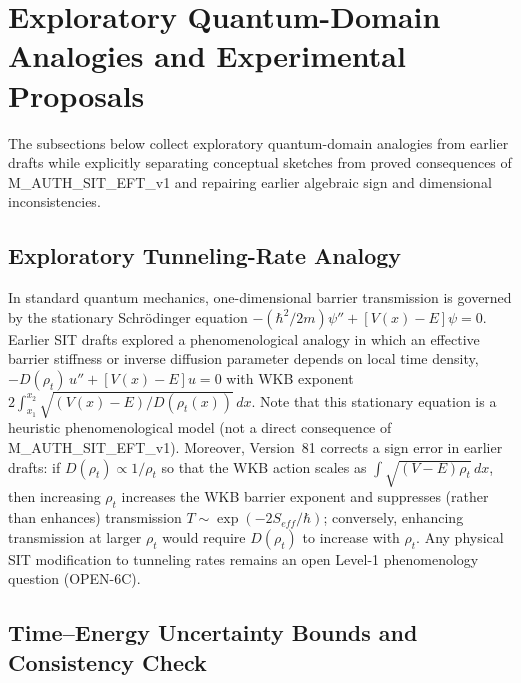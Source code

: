 \documentclass[american,11pt,letterpaper]{article}
\def\mathrm#1{#1}%
\def\texttt#1{#1}%
\def\emph#1{#1}%
\begin{document}
\section{Exploratory Quantum-Domain Analogies and Experimental Proposals}
\label{sec:applications-predictions}

The subsections below collect exploratory quantum-domain analogies from earlier drafts while explicitly separating conceptual sketches from proved consequences of \texttt{M\_AUTH\_SIT\_EFT\_v1} and repairing earlier algebraic sign and dimensional inconsistencies.

\subsection{Exploratory Tunneling-Rate Analogy}
\label{sec:quantum-tunneling}

In standard quantum mechanics, one-dimensional barrier transmission is governed by the stationary Schr\"odinger equation $-(\hbar^2/2m)\psi'' + [V(x) - E]\psi = 0$. Earlier SIT drafts explored a phenomenological analogy in which an effective barrier stiffness or inverse diffusion parameter depends on local time density, $-D(\rho_t)\,u'' + [V(x)-E]u = 0$ with WKB exponent $2\int_{x_1}^{x_2}\sqrt{(V(x)-E)/D(\rho_t(x))}\,dx$. Note that this stationary equation is a heuristic phenomenological model (not a direct consequence of \texttt{M\_AUTH\_SIT\_EFT\_v1}). Moreover, Version~81 corrects a sign error in earlier drafts: if $D(\rho_t) \propto 1/\rho_t$ so that the WKB action scales as $\int\sqrt{(V-E)\rho_t}\,dx$, then \emph{increasing} $\rho_t$ \emph{increases} the WKB barrier exponent and \emph{suppresses} (rather than enhances) transmission $T \sim \exp(-2S_{\mathrm{eff}}/\hbar)$; conversely, enhancing transmission at larger $\rho_t$ would require $D(\rho_t)$ to increase with $\rho_t$. Any physical SIT modification to tunneling rates remains an open Level-1 phenomenology question (\texttt{OPEN-6C}).

\subsection{Time--Energy Uncertainty Bounds and Consistency Check}
\label{sec:quantum-time-energy}
\end{document}
